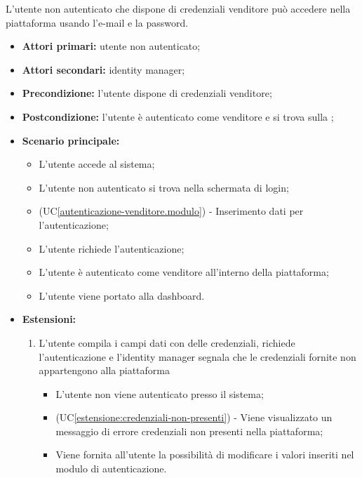 L'utente non autenticato che dispone di credenziali venditore può accedere nella piattaforma usando l'e-mail e la password.
\begin{itemize}
    \item \textbf{Attori primari:} utente non autenticato;
    \item \textbf{Attori secondari:} identity manager;
    \item \textbf{Precondizione:} l'utente dispone di credenziali venditore;
    \item \textbf{Postcondizione:} l'utente è autenticato come venditore e si trova sulla ;
    \item \textbf{Scenario principale:}
    \begin{itemize}
    	\item L'utente accede al sistema;
    	\item L'utente non autenticato si trova nella schermata di login;
    	\item (UC\ref{autenticazione-venditore.modulo}) - Inserimento dati per l'autenticazione;%
    	\item L'utente richiede l'autenticazione;
    	\item L'utente è autenticato come venditore all'interno della piattaforma;
    	\item L'utente viene portato alla dashboard.
    \end{itemize}
	\item \textbf{Estensioni:}
	\begin{enumerate}[label=\lett]
		\item L'utente compila i campi dati con delle credenziali, richiede l'autenticazione e l'identity manager segnala che le credenziali fornite non appartengono alla piattaforma
		\begin{itemize}
			\item L'utente non viene autenticato presso il sistema;
			\item (UC\ref{estensione:credenziali-non-presenti}) - Viene visualizzato un messaggio di errore credenziali non presenti nella piattaforma;
			\item Viene fornita all'utente la possibilità di modificare i valori inseriti nel modulo di autenticazione.
		\end{itemize}
	\end{enumerate} 
\end{itemize}

\label{autenticazione-venditore.modulo}


